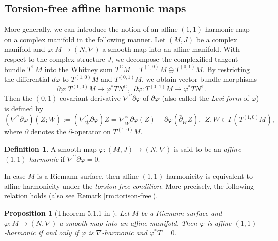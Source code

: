 \documentclass[12pt]{amsart}
\newtheorem{Proposition}[Theorem]{Proposition}
\theoremstyle{definition}
\newtheorem{Definition}{Definition}[section]
\theoremstyle{remark}
\numberwithin{equation}{section}
\begin{document}
\subsection{Torsion-free affine harmonic maps}
 More generally, we can introduce the notion of
 an affine $(1, 1)$-harmonic map on a complex manifold 
 in the following manner. 
 Let $(M,J)$ be a complex manifold and
 $\varphi:M\to (N,\nabla)$ a smooth map into an affine 
 manifold.
 With respect to the complex structure $J$, we decompose 
 the complexified tangent bundle $T^{\mathbb{C}}M$ into the 
 Whitney sum $T^{\mathbb C}M=T^{(1,0)}M\oplus T^{(0,1)}M$.
 By restricting the differential $d\varphi$ to 
 $T^{(1,0)}M$ and $T^{(0,1)}M$, we obtain vector bundle 
 morphisms 
 \begin{equation*}
 \partial \varphi:T^{(1,0)}M\to \varphi^{*}TN^{\mathbb C},
 \ \
 \bar{\partial}\varphi: T^{(0,1)}M\to \varphi^{*}TN^{\mathbb C}.
 \end{equation*}
 Then the $(0,1)$-covariant derivative 
 $\nabla^{\prime\prime}\partial \varphi$ of 
 $\partial \varphi$ (also called the \textit{Levi-form} of $\varphi$) 
 is defined by
 \begin{equation*}
 (\nabla^{\prime\prime}\partial \varphi)(Z;\overline{W}):=
 (\nabla^{\prime\prime}_{\overline W}\partial \varphi)Z=
 \nabla^{\varphi}_{\overline W}\partial\varphi(Z)-
 \partial\varphi(\bar{\partial}_{\overline W}Z),
 \ \ Z, W
 \in \varGamma(T^{(1,0)}M),
 \end{equation*}
 where $\bar \partial$ denotes the $\bar \partial$-operator on 
 $T^{(1, 0)} M$.
\begin{Definition}
 A smooth map $\varphi:(M,J)\to (N,\nabla)$ is said to be 
 an  \textit{affine $(1,1)$-harmonic} 
 if  $\nabla^{\prime\prime}\partial \varphi=0$.
\end{Definition}
 In case $M$ is a Riemann surface, then  affine 
 $(1,1)$-harmonicity
 is equivalent to  affine harmonicity under 
 the {\it torsion free condition}. More precisely, 
 the following relation holds (also see  Remark \ref{rm:torison-free}).
\begin{Proposition}[Theorem 5.1.1 in \cite{Khemar}]
\label{prop:stronglyKehmarcharact}
 Let $M$ be a Riemann surface and $\varphi:M\to (N,\nabla)$ a
 smooth map into an affine manifold. 
 Then $\varphi$ is affine $(1,1)$-harmonic if and only if 
 $\varphi$ is $\nabla$-harmonic and $\varphi^{*}T=0$.
\end{Proposition}
\end{document}
